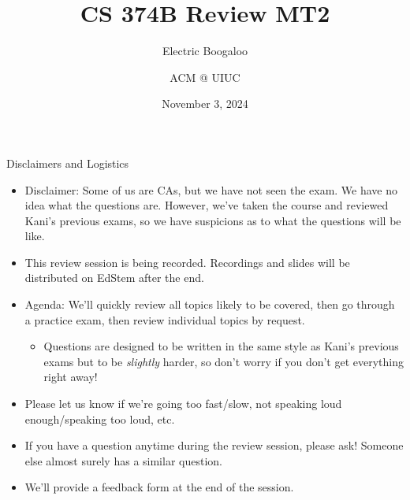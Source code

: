 \documentclass{beamer}
\title[ACM fun]{CS 374B Review MT2}
\subtitle{Electric Boogaloo}
\author{ACM @ UIUC}
\date{November 3, 2024}
\begin{document}
\begin{frame}
  \titlepage
\end{frame}

\begin{frame}[t]{Disclaimers and Logistics}
  \begin{itemize}
  \item \alert{Disclaimer:} Some of us are CAs, but we have not seen the exam. We have no idea what the questions are. However, we've taken the course and reviewed Kani's previous exams, so we have \alert{suspicions} as to what the questions will be like.
  \item This review session is being recorded. Recordings and slides will be distributed on EdStem after the end.
  \item \alert{Agenda:} We'll quickly review all topics likely to be covered, then go through a practice exam, then review individual topics by request.
  \begin{itemize}
      \item Questions are designed to be written in the same style as Kani's previous exams but to be \textit{slightly} harder, so don't worry if you don't get everything right away!
  \end{itemize}
  \item Please let us know if we're going too fast/slow, not speaking loud enough/speaking too loud, etc.
  \item If you have a question anytime during the review session, please ask! Someone else almost surely has a similar question.
  \item We'll provide a feedback form at the end of the session.
  \end{itemize}
\end{frame}
\end{document}
